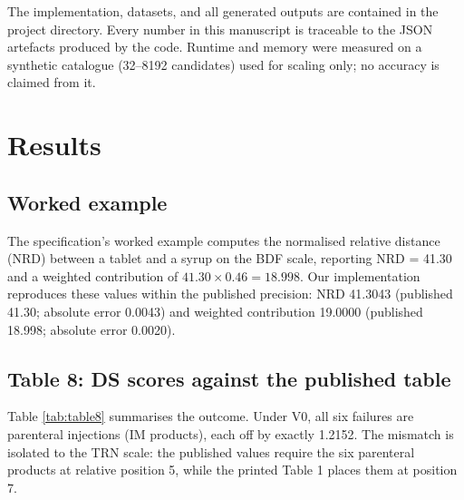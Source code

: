 \documentclass[a4paper]{elsarticle}
\begin{document}
The implementation, datasets, and all generated outputs are contained in the project directory. Every number in this manuscript is traceable to the JSON artefacts produced by the code. Runtime and memory were measured on a synthetic catalogue (32--8192 candidates) used for scaling only; no accuracy is claimed from it.

\section{Results}
\label{sec:results}

\subsection{Worked example}
\label{sec:results-worked}

The specification's worked example computes the normalised relative distance (NRD) between a tablet and a syrup on the BDF scale, reporting NRD = 41.30 and a weighted contribution of $41.30 \times 0.46 = 18.998$. Our implementation reproduces these values within the published precision: NRD 41.3043 (published 41.30; absolute error 0.0043) and weighted contribution 19.0000 (published 18.998; absolute error 0.0020).

\subsection{Table 8: DS scores against the published table}
\label{sec:results-table8}

\begin{table}[htbp]
\centering\small
\caption{Reproduction of the 32 published Table 8 DS scores under two scoring modes. Match tolerance: 0.05 (published one-decimal rounding).}
\label{tab:table8}
\end{table}

Table \ref{tab:table8} summarises the outcome. Under V0, all six failures are parenteral injections (IM products), each off by exactly 1.2152. The mismatch is isolated to the TRN scale: the published values require the six parenteral products at relative position 5, while the printed Table 1 places them at position 7.
\end{document}
